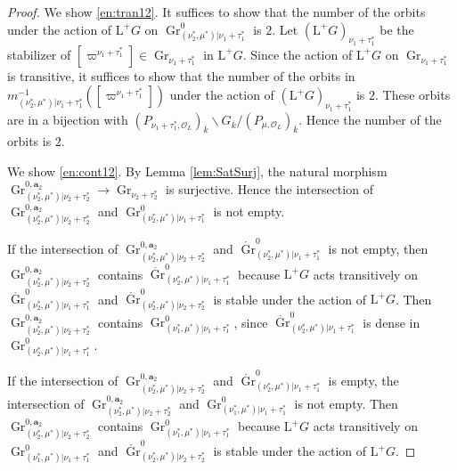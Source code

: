 \documentclass[12pt,a4paper]{article}
\DeclareMathOperator{\Gr}{Gr}
\newcommand{\bfa}{\mathbf{a}}
\newcommand{\cO}{\mathcal{O}}
\newcommand{\rL}{\mathrm{L}}
\newcommand{\ol}{\overline}
\begin{document}
\begin{proof}
We show \ref{en:tran12}. 
It suffices to show that the number of 
the orbits under the action of $\rL^+G$ on 
$\Gr^{0}_{(\nu^*_2, \mu^*) | \nu_1 +\tau_1^*}$ is $2$. 
Let $(\rL^+G)_{\nu_1 +\tau_1^*}$ be the stabilizer of 
$[\varpi^{\nu_1+\tau_1^*}] \in \Gr_{\nu_1+\tau_1^*}$ in $\rL^+G$. 
Since the action of $\rL^+G$ on $\Gr_{\nu_1 +\tau_1^*}$ is transitive, 
it suffices to show that the number of the orbits in 
$m_{(\nu^*_2, \mu^*) | \nu_1 +\tau_1^* }^{-1}([\varpi^{\nu_1 +\tau_1^*}])$ 
under the action of $(\rL^+G)_{\nu_1 +\tau_1^*}$ 
is $2$. 
These orbits are in a bijection with $(P_{\nu_1 +\tau_1^*,\cO_L})_{\ol{k}} \backslash G_{\ol{k}} / (P_{\mu,\cO_L})_{\ol{k}}$. 
Hence the number of the orbits is $2$. 

We show \ref{en:cont12}. 
By Lemma \ref{lem:SatSurj}, the natural morphism 
$\Gr^{0,\bfa_2}_{(\nu^*_2, \mu^*) | \nu_2+\tau_2^*} \to \Gr_{\nu_2+\tau_2^*}$ is surjective. 
Hence the intersection of $\Gr^{0,\bfa_2}_{(\nu^*_2, \mu^*) | \nu_2+\tau_2^*}$ and $\Gr^{0}_{(\nu^*_2, \mu^*) | \nu_1 +\tau_1^*}$ is not empty. 

If the intersection of $\Gr^{0,\bfa_2}_{(\nu^*_2, \mu^*) | \nu_2+\tau_2^*}$ and $\mathring{\Gr}^{0}_{(\nu^*_2, \mu^*) | \nu_1 +\tau_1^*}$ is not empty, 
then $\Gr^{0,\bfa_2}_{(\nu^*_2, \mu^*) | \nu_2 +\tau_2^*}$ contains  $\mathring{\Gr}^{0}_{(\nu^*_2, \mu^*) | \nu_1 +\tau_1^*}$ 
because $\rL^+G$ acts transitively on $\mathring{\Gr}^{0}_{(\nu^*_2, \mu^*) | \nu_1 +\tau_1^*}$ and $\mathring{\Gr}^{0}_{(\nu^*_2, \mu^*) | \nu_2 +\tau_2^*}$ is stable under the action of $\rL^+G$. Then $\Gr^{0,\bfa_2}_{(\nu^*_2, \mu^*) | \nu_2 +\tau_2^*}$ contains $\Gr^{0}_{(\nu^*_1, \mu^*) | \nu_1 +\tau_1^*}$, since  $\mathring{\Gr}^{0}_{(\nu^*_2, \mu^*) | \nu_1 +\tau_1^*}$ is dense in $\Gr^{0}_{(\nu^*_2, \mu^*) | \nu_1 +\tau_1^*}$. 

If the intersection of $\Gr^{0,\bfa_2}_{(\nu^*_2, \mu^*) | \nu_2 +\tau_2^*}$ and $\mathring{\Gr}^{0}_{(\nu^*_2, \mu^*) | \nu_1 +\tau_1^*}$ is empty, 
the intersection of $\Gr^{0,\bfa_2}_{(\nu^*_2, \mu^*) | \nu_2 +\tau_2^*}$ and $\Gr^{0}_{(\nu^*_1, \mu^*) | \nu_1 +\tau_1^*}$ is not empty. Then 
$\Gr^{0,\bfa_2}_{(\nu^*_2, \mu^*) | \nu_2 +\tau_2^*}$ contains $\Gr^{0}_{(\nu^*_1, \mu^*) | \nu_1 +\tau_1^*}$ because 
$\rL^+G$ acts transitively on $\Gr^{0}_{(\nu^*_1, \mu^*) | \nu_1 +\tau_1^*}$ and $\mathring{\Gr}^{0}_{(\nu^*_2, \mu^*) | \nu_2 +\tau_2^*}$ is stable under the action of $\rL^+G$. 
\end{proof}
\end{document}
